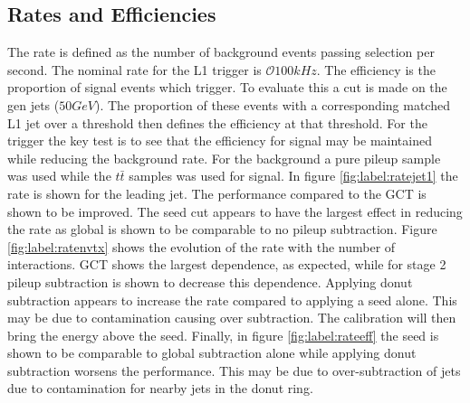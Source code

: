 \subsection{Rates and Efficiencies}
The rate is defined as the number of background events passing selection per second. The nominal rate for the L1 trigger is $\mathcal{O}100kHz$. The efficiency is the proportion of signal events which trigger. To evaluate this a cut is made on the gen jets ($50GeV$). The proportion of these events with a corresponding matched L1 jet over a threshold then defines the efficiency at that threshold.  For the trigger the key test is to see that the efficiency for signal may be maintained while reducing the background rate. For the background a pure pileup sample was used while the $t\bar{t}$ samples was used for signal. In figure \ref{fig:label:ratejet1} the rate is shown for the leading jet. The performance compared to the GCT is shown to be improved. The seed cut appears to have the largest effect in reducing the rate as global is shown to be comparable to no pileup subtraction. Figure \ref{fig:label:ratenvtx} shows the evolution of the rate with the number of interactions. GCT shows the largest dependence, as expected, while for stage 2 pileup subtraction is shown to decrease this dependence. Applying donut subtraction appears to increase the rate compared to applying a seed alone. This may be due to contamination causing over subtraction. The calibration will then bring the energy above the seed. Finally, in figure \ref{fig:label:rateeff} the seed is shown to be comparable to global subtraction alone while applying donut subtraction worsens the performance. This may be due to over-subtraction of jets due to contamination for nearby jets in the donut ring.
